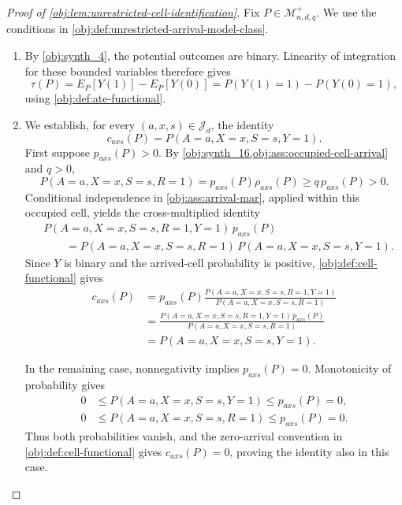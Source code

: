 \begin{proof}[Proof of \cref{obj:lem:unrestricted-cell-identification}]
Fix \(P\in\mathcal M^{+}_{n,d,q}\). We use the conditions in \cref{obj:def:unrestricted-arrival-model-class}.

\begin{enumerate}
\item By \cref{obj:synth_4}, the potential outcomes are binary. Linearity of integration for these bounded variables therefore gives
\[
\tau(P)
=E_P[Y(1)]-E_P[Y(0)]
=P(Y(1)=1)-P(Y(0)=1),
\]
using \cref{obj:def:ate-functional}. %

\item We establish, for every \((a,x,s)\in\mathcal J_d\), the identity
\[
c_{axs}(P)=P(A=a,X=x,S=s,Y=1).
\]
First suppose \(p_{axs}(P)>0\). By \cref{obj:synth_16,obj:ass:occupied-cell-arrival} and \(q>0\),
\[
P(A=a,X=x,S=s,R=1)
=p_{axs}(P)\rho_{axs}(P)
\ge q\,p_{axs}(P)>0.
\]
Conditional independence in \cref{obj:ass:arrival-mar}, applied within this occupied cell, yields the cross-multiplied identity
\[
\begin{aligned}
&P(A=a,X=x,S=s,R=1,Y=1)\,p_{axs}(P)\\
&\qquad =
P(A=a,X=x,S=s,R=1)\,
P(A=a,X=x,S=s,Y=1).
\end{aligned}
\]
Since \(Y\) is binary and the arrived-cell probability is positive, \cref{obj:def:cell-functional} gives
\[
\begin{aligned}
c_{axs}(P)
&=p_{axs}(P)
\frac{P(A=a,X=x,S=s,R=1,Y=1)}
     {P(A=a,X=x,S=s,R=1)}\\
&=\frac{P(A=a,X=x,S=s,R=1,Y=1)\,p_{axs}(P)}
        {P(A=a,X=x,S=s,R=1)}\\
&=P(A=a,X=x,S=s,Y=1).
\end{aligned}
\]

In the remaining case, nonnegativity implies \(p_{axs}(P)=0\). Monotonicity of probability gives
\[
\begin{aligned}
0&\le P(A=a,X=x,S=s,Y=1)\le p_{axs}(P)=0,\\
0&\le P(A=a,X=x,S=s,R=1)\le p_{axs}(P)=0.
\end{aligned}
\]
Thus both probabilities vanish, and the zero-arrival convention in
\cref{obj:def:cell-functional} gives \(c_{axs}(P)=0\), proving the identity also in this case. %


\end{enumerate}
\end{proof}
